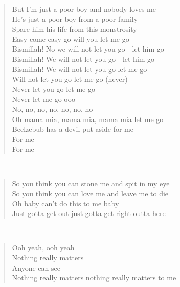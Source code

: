 \noindent\begin{minipage}{\linewidth}
\begin{verse}
	But I'm just a poor boy and nobody loves me\\
	He's just a poor boy from a poor family\\
	Spare him his life from this monstrosity\\
	Easy come easy go will you let me go\\
	Bismillah! No we will not let you go - let him go\\
	Bismillah! We will not let you go - let him go\\
	Bismillah! We will not let you go let me go\\
	Will not let you go let me go (never)\\
	Never let you go let me go\\
	Never let me go ooo\\
	No, no, no, no, no, no, no\\
	Oh mama mia, mama mia, mama mia let me go\\
	Beelzebub has a devil put aside for me\\
	For me\\
	For me\\
\end{verse}
\end{minipage}\\[10pt]
\noindent\begin{minipage}{\linewidth}
\begin{verse}
	So you think you can stone me and spit in my eye\\
	So you think you can love me and leave me to die\\
	Oh baby can't do this to me baby\\
	Just gotta get out just gotta get right outta here\\
\end{verse}
\end{minipage}\\[10pt]
\noindent\begin{minipage}{\linewidth}
\begin{verse}
	Ooh yeah, ooh yeah\\
	Nothing really matters\\
	Anyone can see\\
	Nothing really matters nothing really matters to me\\
\end{verse}
\end{minipage}\\[10pt]
